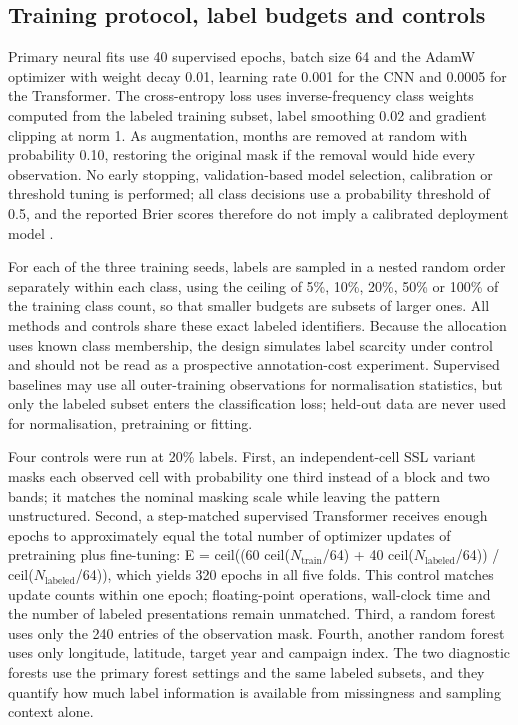 \documentclass[11pt,a4paper]{article}
\begin{document}
\subsection{Training protocol, label budgets and controls}
Primary neural fits use 40 supervised epochs, batch size 64 and the AdamW optimizer with weight decay 0.01, learning rate 0.001 for the CNN and 0.0005 for the Transformer. The cross-entropy loss uses inverse-frequency class weights computed from the labeled training subset, label smoothing 0.02 and gradient clipping at norm 1. As augmentation, months are removed at random with probability 0.10, restoring the original mask if the removal would hide every observation. No early stopping, validation-based model selection, calibration or threshold tuning is performed; all class decisions use a probability threshold of 0.5, and the reported Brier scores therefore do not imply a calibrated deployment model \cite{ref6}.

For each of the three training seeds, labels are sampled in a nested random order separately within each class, using the ceiling of 5\%, 10\%, 20\%, 50\% or 100\% of the training class count, so that smaller budgets are subsets of larger ones. All methods and controls share these exact labeled identifiers. Because the allocation uses known class membership, the design simulates label scarcity under control and should not be read as a prospective annotation-cost experiment. Supervised baselines may use all outer-training observations for normalisation statistics, but only the labeled subset enters the classification loss; held-out data are never used for normalisation, pretraining or fitting.

Four controls were run at 20\% labels. First, an independent-cell SSL variant masks each observed cell with probability one third instead of a block and two bands; it matches the nominal masking scale while leaving the pattern unstructured. Second, a step-matched supervised Transformer receives enough epochs to approximately equal the total number of optimizer updates of pretraining plus fine-tuning: E = ceil((60 ceil($N_{\mathrm{train}}$/64) + 40 ceil($N_{\mathrm{labeled}}$/64)) / ceil($N_{\mathrm{labeled}}$/64)), which yields 320 epochs in all five folds. This control matches update counts within one epoch; floating-point operations, wall-clock time and the number of labeled presentations remain unmatched. Third, a random forest uses only the 240 entries of the observation mask. Fourth, another random forest uses only longitude, latitude, target year and campaign index. The two diagnostic forests use the primary forest settings and the same labeled subsets, and they quantify how much label information is available from missingness and sampling context alone.
\end{document}
